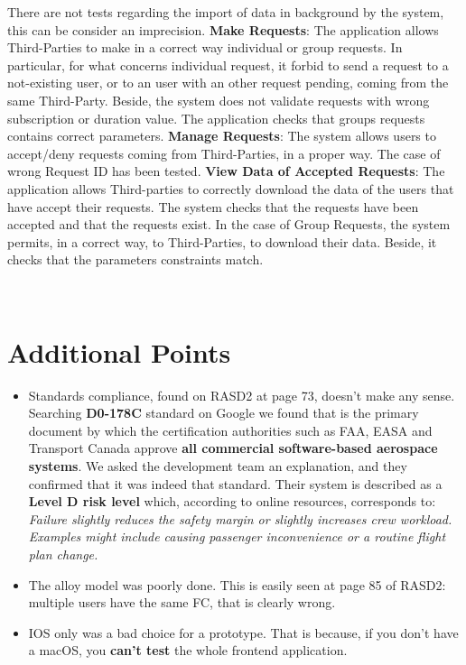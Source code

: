 \documentclass[a4paper]{article}
\begin{document}
There are not  tests regarding the import of data in background by the system, this can be consider an imprecision. 
\newline\newline
\textbf{Make Requests}:\newline
The application allows Third-Parties to make in a correct way individual or group requests.\newline
In particular, for what concerns individual request, it forbid  to send a request to a not-existing user, or to an user with an other request pending, coming from the same Third-Party. Beside, the system does not validate requests with wrong subscription or duration value.\newline
The application checks that groups requests contains correct parameters.
\newline\newline
\textbf{Manage Requests}:\newline
The system allows users to accept/deny requests coming from Third-Parties, in a proper way. The case of wrong Request ID has been tested.
\newline\newline
\textbf{View Data of Accepted Requests}:\newline
The application allows Third-parties to correctly download the data of the users that have accept their requests. The system checks that the requests have been accepted and that the requests exist.
In the case of Group Requests, the system permits, in a correct way, to Third-Parties, to download their data. Beside, it checks that the parameters constraints match. 







\


\newpage
\section{Additional Points}
\begin{itemize}
    \item Standards compliance, found on RASD2 at page 73, doesn't make any sense. Searching \textbf{D0-178C} standard on Google we found that is the primary document by which the certification authorities such as FAA, EASA and Transport Canada approve \textbf{all commercial software-based aerospace systems}. We asked the development team an explanation, and they confirmed that it was indeed that standard.
    Their system is described as a \textbf{Level D risk level} which, according to online resources, corresponds to: \textit{Failure slightly reduces the safety margin or slightly increases crew workload. Examples might include causing passenger inconvenience or a routine flight plan change.}
    \item The alloy model was poorly done. This is easily seen at page 85 of RASD2: multiple users have the same FC, that is clearly wrong.
    \item IOS only was a bad choice for a prototype. That is because, if you don't have a macOS, you \textbf{can't test} the whole frontend application.
\end{itemize}
\end{document}
